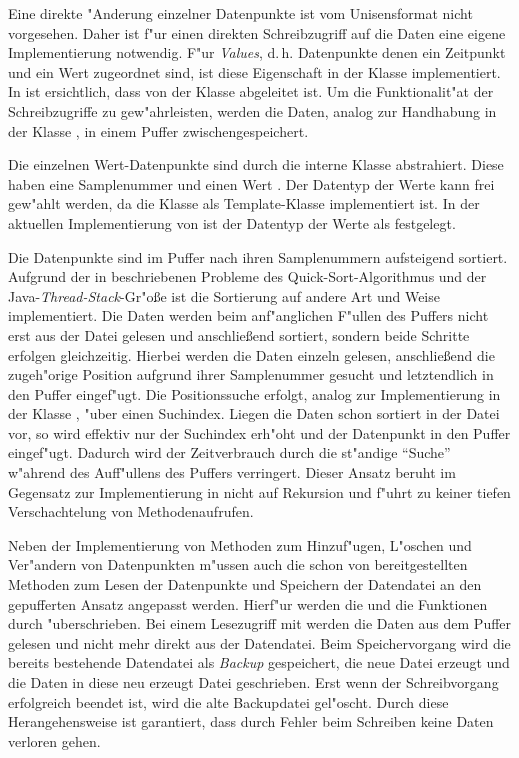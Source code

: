 Eine direkte "Anderung einzelner Datenpunkte ist vom Unisensformat nicht vorgesehen.
Daher ist f"ur einen direkten Schreibzugriff auf die Daten eine eigene Implementierung notwendig.
F"ur \emph{Values}, d.\,h. Datenpunkte denen ein Zeitpunkt und ein Wert zugeordnet sind, ist diese Eigenschaft in der Klasse  implementiert.
In  ist ersichtlich, dass  von der Klasse  abgeleitet ist.
Um die Funktionalit"at der Schreibzugriffe zu gew"ahrleisten, werden die Daten, analog zur Handhabung in der Klasse , in einem Puffer  zwischengespeichert.

Die einzelnen Wert-Datenpunkte sind durch die interne Klasse  abstrahiert.
Diese haben eine Samplenummer  und einen Wert .
Der Datentyp der Werte kann frei gew"ahlt werden, da die Klasse  als Template-Klasse implementiert ist.
In der aktuellen Implementierung von  ist der Datentyp der Werte als  festgelegt.

Die Datenpunkte sind im Puffer  nach ihren Samplenummern aufsteigend sortiert.
Aufgrund der in  beschriebenen Probleme des Quick-Sort-Algorithmus und der Java-\emph{Thread-Stack}-Gr"o{\ss}e ist die Sortierung auf andere Art und Weise implementiert.
Die Daten werden beim anf"anglichen F"ullen des Puffers nicht erst aus der Datei gelesen und anschlie{\ss}end sortiert, sondern beide Schritte erfolgen gleichzeitig.
Hierbei werden die Daten einzeln gelesen, anschlie{\ss}end die zugeh"orige Position aufgrund ihrer Samplenummer gesucht und letztendlich in den Puffer eingef"ugt.
Die Positionssuche erfolgt, analog zur Implementierung in der Klasse , "uber einen Suchindex.
Liegen die Daten schon sortiert in der Datei vor, so wird effektiv nur der Suchindex erh"oht und der Datenpunkt in den Puffer eingef"ugt.
Dadurch wird der Zeitverbrauch durch die st"andige "`Suche"' w"ahrend des Auff"ullens des Puffers verringert.
Dieser Ansatz beruht im Gegensatz zur Implementierung in  nicht auf Rekursion und f"uhrt zu keiner tiefen Verschachtelung von Methodenaufrufen.

Neben der Implementierung von Methoden zum Hinzuf"ugen, L"oschen und Ver"andern von Datenpunkten m"ussen auch die schon von  bereitgestellten Methoden zum Lesen der Datenpunkte und Speichern der Datendatei an den gepufferten Ansatz angepasst werden.
Hierf"ur werden die  und die  Funktionen durch  "uberschrieben.
Bei einem Lesezugriff mit  werden die Daten aus dem Puffer gelesen und nicht mehr direkt aus der Datendatei.
Beim Speichervorgang wird die bereits bestehende Datendatei als \emph{Backup} gespeichert, die neue Datei erzeugt und die Daten in diese neu erzeugt Datei geschrieben.
Erst wenn der Schreibvorgang erfolgreich beendet ist, wird die alte Backupdatei gel"oscht.
Durch diese Herangehensweise ist garantiert, dass durch Fehler beim Schreiben keine Daten verloren gehen.

